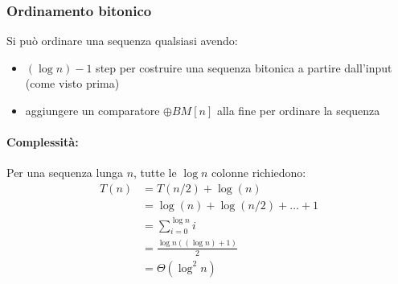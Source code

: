 \subsubsection{Ordinamento bitonico}

Si può ordinare una sequenza qualsiasi avendo: 
\begin{itemize}
    \item $(\log n) - 1$ step per costruire una sequenza bitonica a partire dall'input (come visto prima)
    
    \item aggiungere un comparatore $\oplus BM [n]$ alla fine per ordinare la sequenza
\end{itemize}

\paragraph{Complessità:} Per una sequenza lunga $n$, tutte le $\log n$ colonne richiedono: 
\begin{align*}
    T(n) & = T(n/2) + \log (n) \\
    & = \log (n) + \log (n/2) + \dots + 1 \\
    & = \sum_{i=0}^{\log n} i \\
    & = \frac{\log n \left((\log n) + 1\right)}{2} \\
    & = \Theta (\log^2 n) 
\end{align*}
